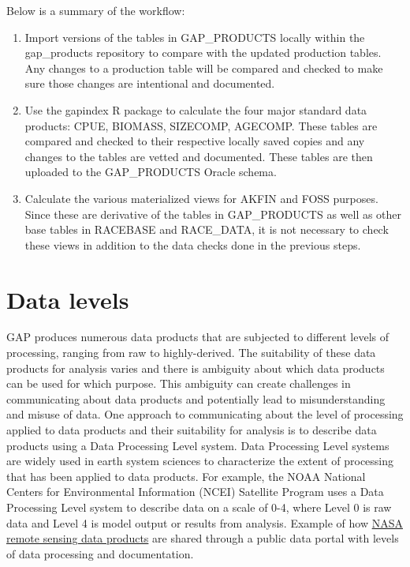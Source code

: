 \documentclass[
  letterpaper,
  oneside,
  open=any]{scrbook}
\begin{document}
Below is a summary of the workflow:

\begin{enumerate}
\def\labelenumi{\arabic{enumi}.}
\item
  Import versions of the tables in GAP\_PRODUCTS locally within the
  gap\_products repository to compare with the updated production
  tables. Any changes to a production table will be compared and checked
  to make sure those changes are intentional and documented.
\item
  Use the gapindex R package to calculate the four major standard data
  products: CPUE, BIOMASS, SIZECOMP, AGECOMP. These tables are compared
  and checked to their respective locally saved copies and any changes
  to the tables are vetted and documented. These tables are then
  uploaded to the GAP\_PRODUCTS Oracle schema.
\item
  Calculate the various materialized views for AKFIN and FOSS purposes.
  Since these are derivative of the tables in GAP\_PRODUCTS as well as
  other base tables in RACEBASE and RACE\_DATA, it is not necessary to
  check these views in addition to the data checks done in the previous
  steps.
\end{enumerate}

\hypertarget{data-levels}{%
\section{Data levels}\label{data-levels}}

GAP produces numerous data products that are subjected to different
levels of processing, ranging from raw to highly-derived. The
suitability of these data products for analysis varies and there is
ambiguity about which data products can be used for which purpose. This
ambiguity can create challenges in communicating about data products and
potentially lead to misunderstanding and misuse of data. One approach to
communicating about the level of processing applied to data products and
their suitability for analysis is to describe data products using a Data
Processing Level system. Data Processing Level systems are widely used
in earth system sciences to characterize the extent of processing that
has been applied to data products. For example, the NOAA National
Centers for Environmental Information (NCEI) Satellite Program uses a
Data Processing Level system to describe data on a scale of 0-4, where
Level 0 is raw data and Level 4 is model output or results from
analysis. Example of how
\href{https://ladsweb.modaps.eosdis.nasa.gov/search/}{NASA remote
sensing data products} are shared through a public data portal with
levels of data processing and documentation.
\end{document}

